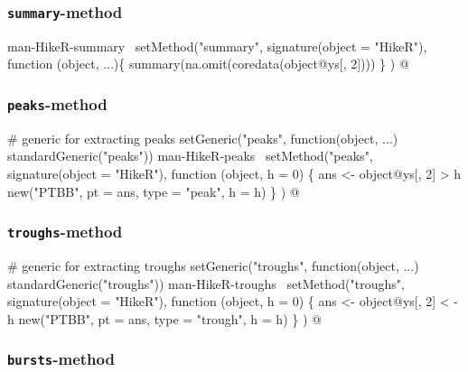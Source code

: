 \documentclass[a4paper]{article}
\begin{document}
\subsubsection{\texttt{summary}-method}

\nwenddocs{}\endmoddef
\LA{}man-HikeR-summary~{\nwtagstyle{}}\RA{}
setMethod("summary",
          signature(object = "HikeR"),
          function (object, ...)\{
              summary(na.omit(coredata(object@ys[, 2])))
          \}
)
\nwendcode{}@

\subsubsection{\texttt{peaks}-method}

\nwenddocs{}\endmoddef
# generic for extracting peaks
setGeneric("peaks", function(object, ...) standardGeneric("peaks"))
\LA{}man-HikeR-peaks~{\nwtagstyle{}}\RA{}
setMethod("peaks",
    signature(object = "HikeR"),
    function (object, h = 0) \{
        ans <- object@ys[, 2] > h
        new("PTBB", pt = ans, type = "peak", h = h)
    \}
)
\nwendcode{}@

\subsubsection{\texttt{troughs}-method}

\nwenddocs{}\endmoddef
# generic for extracting troughs
setGeneric("troughs", function(object, ...) standardGeneric("troughs"))
\LA{}man-HikeR-troughs~{\nwtagstyle{}}\RA{}
setMethod("troughs",
    signature(object = "HikeR"),
    function (object, h = 0) \{
        ans <- object@ys[, 2] < -h
        new("PTBB", pt = ans, type = "trough", h = h)
    \}
)
\nwendcode{}@

\subsubsection{\texttt{bursts}-method}
\end{document}
